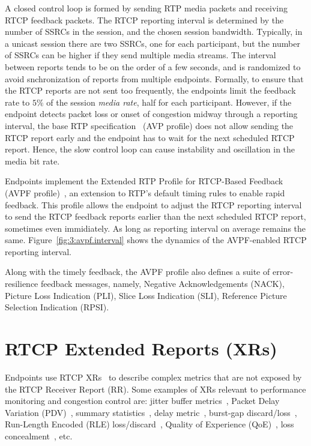 A closed control loop is formed by sending RTP media packets and receiving
RTCP feedback packets. The RTCP reporting interval is determined by the number
of SSRCs in the session, and the chosen session bandwidth. Typically, in a
unicast session there are two SSRCs, one for each participant, but the number
of SSRCs can be higher if they send multiple media streams. The interval
between reports tends to be on the order of a few seconds, and is randomized
to avoid snchronization of reports from multiple endpoints. Formally, to
ensure that the RTCP reports are not sent too frequently, the endpoints limit
the feedback rate to $5\%$ of the session \textit{media rate}, half for each
participant. However, if the endpoint detects packet loss or onset of
congestion midway through a reporting interval, the base RTP
specification~\cite{rfc3550} (AVP profile) does not allow sending the RTCP
report early and the endpoint has to wait for the next scheduled RTCP report.
Hence, the slow control loop can cause instability and oscillation in the
media bit rate.


Endpoints implement the Extended RTP Profile for RTCP-Based Feedback (AVPF
profile)~\cite{rfc4585}, an extension to RTP's default timing rules to enable
rapid feedback. This profile allows the endpoint to adjust the RTCP reporting
interval to send the RTCP feedback reports earlier than the next scheduled
RTCP report, sometimes even immidiately. As long as reporting interval on
average remains the same. Figure~\ref{fig:3:avpf.interval} shows the dynamics
of the AVPF-enabled RTCP reporting interval.

Along with the timely feedback, the AVPF profile also defines a suite of
error-resilience feedback messages, namely, Negative Acknowledgements (NACK),
Picture Loss Indication (PLI), Slice Loss Indication (SLI), Reference Picture
Selection Indication (RPSI).

\section{RTCP Extended Reports (XRs)}

Endpoints use RTCP XRs~\cite{rfc3611} to describe complex metrics that are not
exposed by the RTCP Receiver Report (RR). Some examples of XRs relevant to
performance monitoring and congestion control are: jitter buffer
metrics~\cite{draft.xr.jb}, Packet Delay Variation (PDV)~\cite{rfc6798}, summary
statistics~\cite{draft.xr.stat}, delay metric~\cite{rfc6843}, burst-gap
discard/loss~\cite{draft.xr.bg.loss, draft.xr.bg.discard}, Run-Length Encoded
(RLE) loss/discard~\cite{draft.xr.discard.rle}, Quality of Experience
(QoE)~\cite{draft.xr.qoe}, loss concealment~\cite{draft.xr.conceal}, etc.


